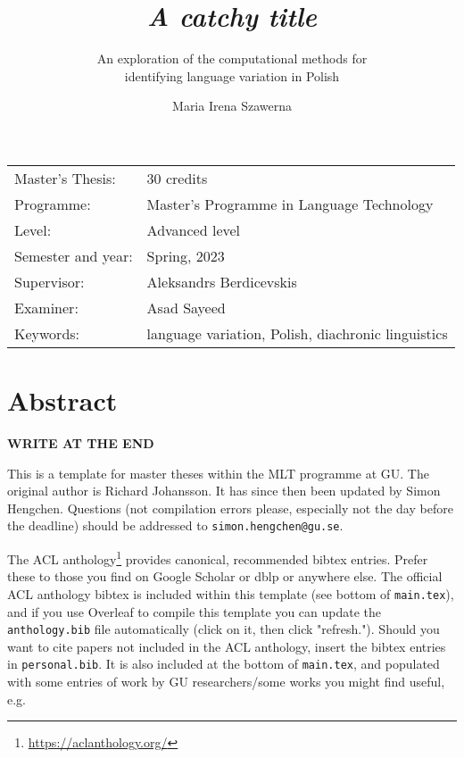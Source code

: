 \documentclass[11pt, a4paper]{article}
\title{\textit{A catchy title}}  %
\subtitle{An exploration of the computational methods for \\ identifying language variation in Polish}
\author{Maria Irena Szawerna}
\begin{document}
\begin{titlepage}

\maketitle

\vfill

\begingroup
\renewcommand*{\arraystretch}{1.2}
\begin{tabular}{l@{\hskip 20mm}l}
\hline
Master's Thesis: & 30 credits \\
Programme: & Master’s Programme in Language Technology\\
Level: & Advanced level \\
Semester and year: & Spring, 2023 \\
Supervisor: & Aleksandrs Berdicevskis \\
Examiner: & Asad Sayeed \\ %
Keywords: & language variation, Polish, diachronic linguistics %
\end{tabular}
\endgroup

\thispagestyle{empty}
\end{titlepage}

\newpage
\singlespacing
\section*{Abstract}

\textbf{WRITE AT THE END}

This is a template for master theses within the MLT programme at GU. The original author is Richard Johansson. It has since then been updated by Simon Hengchen. Questions (not compilation errors please, especially not the day before the deadline) should be addressed to \texttt{simon.hengchen@gu.se}.

The ACL anthology\footnote{\url{https://aclanthology.org/}} provides canonical, recommended bibtex entries. Prefer these to those you find on Google Scholar or dblp or anywhere else. The official ACL anthology bibtex is included within this template (see bottom of \texttt{main.tex}), and if you use Overleaf to compile this template you can update the \texttt{anthology.bib} file automatically (click on it, then click "refresh."). Should you want to cite papers not included in the ACL anthology, insert the bibtex entries in \texttt{personal.bib}. It is also included at the bottom of \texttt{main.tex}, and populated with some entries of work by GU researchers/some works you might find useful, e.g.
\end{document}
